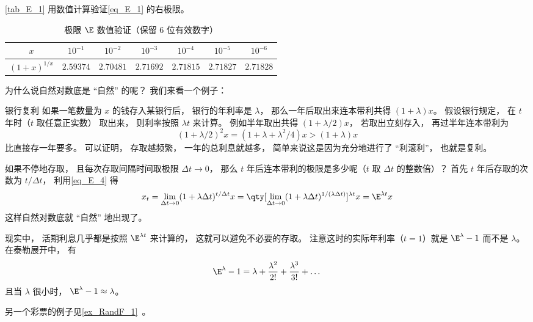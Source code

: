 \autoref{tab_E_1} 用数值计算验证\autoref{eq_E_1} 的右极限。
\begin{table}[ht]
\centering
\caption{极限 $\E$ 数值验证（保留 6 位有效数字）}\label{tab_E_1}
\begin{tabular}{|c|c|c|c|c|c|c|}
\hline
$x$ & $10^{-1}$ & $10^{-2}$ & $10^{-3}$ & $10^{-4}$ & $10^{-5}$ & $10^{-6}$ \\
\hline
$(1 + x)^{1/x}$ & $2.59374$ & $2.70481$ & $2.71692$ & $2.71815$ & $2.71827$ & $2.71828$ \\
\hline
\end{tabular}
\end{table}

为什么说自然对数底是 “自然” 的呢？ 我们来看一个例子：

\begin{example}{银行复利}
如果一笔数量为 $x$ 的钱存入某银行后， 银行的年利率是 $\lambda$， 那么一年后取出来连本带利共得 $(1+\lambda)x$。 假设银行规定， 在 $t$ 年时（$t$ 取任意正实数） 取出来， 则利率按照 $\lambda t$ 来计算。 例如半年取出共得 $(1+\lambda/2)x$， 若取出立刻存入， 再过半年连本带利为
\begin{equation}
(1+\lambda/2)^2 x = (1 + \lambda + \lambda^2/4)x > (1 + \lambda) x
\end{equation}
比直接存一年要多。 可以证明， 存取越频繁， 一年的总利息就越多， 简单来说这是因为充分地进行了 “利滚利”， 也就是复利。

如果不停地存取， 且每次存取间隔时间取极限 $\Delta t \to 0$， 那么 $t$ 年后连本带利的极限是多少呢（$t$ 取 $\Delta t$ 的整数倍）？ 首先 $t$ 年后存取的次数为 $t/\Delta t$， 利用\autoref{eq_E_4} 得
\begin{equation}
x_t = \lim_{\Delta t\to 0}(1 + \lambda \Delta t)^{t/\Delta t} x
= \qty[\lim_{\Delta t\to 0}(1 + \lambda \Delta t)^{1/(\lambda \Delta t)}]^{\lambda t} x
= \E^{\lambda t} x
\end{equation}
这样自然对数底就 “自然” 地出现了。

现实中， 活期利息几乎都是按照 $\E^{\lambda t}$ 来计算的， 这就可以避免不必要的存取。 注意这时的实际年利率（$t = 1$）就是 $\E^\lambda - 1$ 而不是 $\lambda$。 在泰勒展开中， 有
\begin{equation}
\E^\lambda - 1 = \lambda + \frac{\lambda^2}{2!} + \frac{\lambda^3}{3!} + \dots
\end{equation}
且当 $\lambda$ 很小时， $\E^\lambda - 1 \approx \lambda$。
\end{example}

另一个彩票的例子见\autoref{ex_RandF_1}~。

